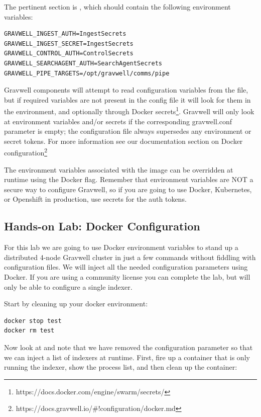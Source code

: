 
The pertinent section is , which should contain the
following environment variables:

\begin{Verbatim}[breaklines=true]
GRAVWELL_INGEST_AUTH=IngestSecrets
GRAVWELL_INGEST_SECRET=IngestSecrets
GRAVWELL_CONTROL_AUTH=ControlSecrets
GRAVWELL_SEARCHAGENT_AUTH=SearchAgentSecrets
GRAVWELL_PIPE_TARGETS=/opt/gravwell/comms/pipe
\end{Verbatim}

Gravwell components will attempt to read configuration variables from
the  file, but if required variables are not present in
the config file it will look for them in the environment, and
optionally through Docker
secrets\footnote{https://docs.docker.com/engine/swarm/secrets/}. Gravwell
will only look at environment variables and/or secrets if the corresponding
gravwell.conf parameter is empty; the configuration file always
supersedes any environment or secret tokens. For more information see
our documentation section on Docker
configuration\footnote{https://docs.gravwell.io/\#!configuration/docker.md}

The environment variables associated with the image can be overridden
at runtime using the  Docker flag. Remember that environment
variables are NOT a secure way to configure Gravwell, so if you are going
to use Docker, Kubernetes, or Openshift in production, use secrets
for the auth tokens.

\subsection{Hands-on Lab: Docker Configuration}

For this lab we are going to use Docker environment variables to stand
up a distributed 4-node Gravwell cluster in just a few commands without
fiddling with configuration files. We will inject all the needed
configuration parameters using Docker. If you are using a community
license you can complete the lab, but will only be able to configure a
single indexer.

Start by cleaning up your docker environment:

\begin{Verbatim}[breaklines=true]
docker stop test
docker rm test
\end{Verbatim}

Now look at 
and note that we have removed the 
configuration parameter so that we can inject a list of
indexers at runtime. First, fire up a container that is only running the
indexer, show the process list, and then clean up the container:

